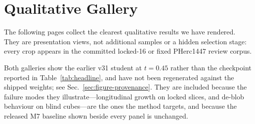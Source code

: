 \clearpage
\onecolumn
\section{Qualitative Gallery}
\label{sec:gallery}

The following pages collect the clearest qualitative results we have rendered.
They are presentation views, not additional samples or a hidden selection stage:
every crop appears in the committed locked-16 or fixed PHerc1447 review corpus.

Both galleries show the earlier v31 student at $t=0.45$ rather than the
checkpoint reported in Table~\ref{tab:headline}, and have not been regenerated
against the shipped weights; see Sec.~\ref{sec:figure-provenance}.
They are included because the failure modes they illustrate---longitudinal
growth on locked slices, and de-blob behaviour on blind cubes---are the ones the
method targets, and because the released M7 baseline shown beside every panel is
unchanged.

\begin{center}
  \captionsetup{hypcap=false}
  \label{fig:gallery-locked}
\end{center}

\clearpage
\begin{center}
  \captionsetup{hypcap=false}
  \label{fig:gallery-blind}
\end{center}

\clearpage
\twocolumn
